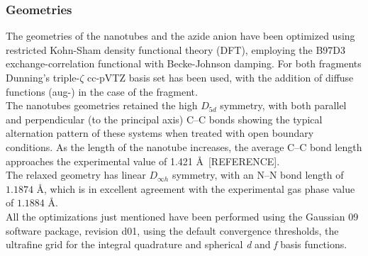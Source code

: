 \documentclass[utf8]{article}
\begin{document}
\subsubsection{Geometries}
The geometries of the nanotubes and the azide anion have been optimized using restricted Kohn-Sham density functional theory (DFT), employing the B97D3 exchange-correlation functional with Becke-Johnson damping\cite{Grimme2010,Grimme2011}.
For both fragments Dunning's triple-$\zeta$ cc-pVTZ basis set\cite{DunningJr1989} has been used, with the addition of diffuse functions (aug-)\cite{Kendall1992} in the case of the \ntm fragment.\\
The nanotubes geometries retained the high $D_{5d}$ symmetry, with both parallel and perpendicular (to the principal axis) C--C bonds showing the typical alternation pattern of these systems when treated with open boundary conditions\cite{Zhou2004,Galano2006}. As the length of the nanotube increases, the average C--C bond length approaches the experimental value of 1.421 \AA\ [REFERENCE].\\
The relaxed \ntm geometry has linear $D_{\infty h}$ symmetry, with an N--N bond length of $1.1874$ \AA, which is in excellent agreement with the experimental gas phase value of $1.1884$ \AA\cite{Polak1987}.\\
All the optimizations just mentioned have been performed using the Gaussian 09 software package, revision d01\cite{g09}, using the default convergence thresholds, the ultrafine grid for the integral quadrature and spherical \textit{d} and \textit{f} basis functions.
\end{document}
